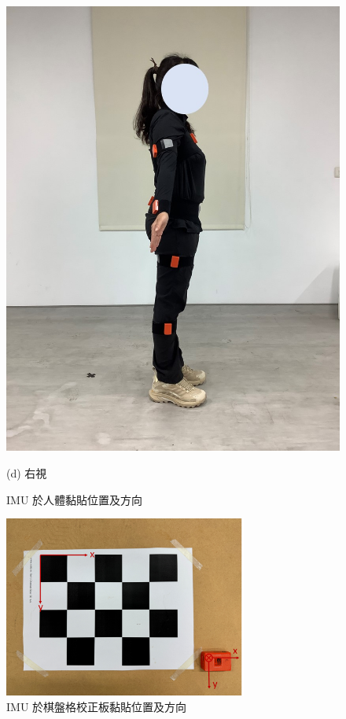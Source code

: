 \begin{figure}[!ht]
\begin{minipage}{.25\textwidth}
     \includegraphics[width=.95\linewidth]{figure/ch3_fig_rightimu.JPG}
     \caption*{(d) 右視}
   \end{minipage}
   \caption[IMU 於人體黏貼位置及方向]{IMU 於人體黏貼位置及方向}
   \label{ch3_fig_humanimu}
\end{figure}

\begin{figure}[!ht]
   \centering
   \includegraphics[width=8cm]{figure/ch3_fig_imgimu.png}
    \caption[IMU 於棋盤格校正板黏貼位置及方向]{IMU 於棋盤格校正板黏貼位置及方向}
    \label{ch3_fig_imgimu}
\end{figure}

